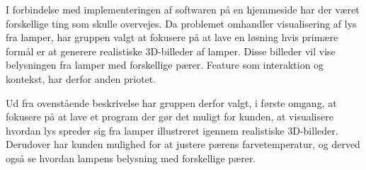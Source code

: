 I forbindelse med implementeringen af softwaren på en hjemmeside har der været forskellige ting som skulle overvejes. Da problemet omhandler visualisering af lys fra lamper, har gruppen valgt at fokusere på at lave en løsning hvis primære formål er at generere realistiske 3D-billeder af lamper. Disse billeder vil vise belysningen fra lamper med forskellige pærer. Feature som interaktion og kontekst, har derfor anden priotet. 

Ud fra ovenstående beskrivelse har gruppen derfor valgt, i første omgang, at fokusere på at lave et program der gør det muligt for kunden, at visualisere hvordan lys spreder sig fra lamper illustreret igennem realistiske 3D-billeder. Derudover har kunden mulighed for at justere pærens farvetemperatur, og derved også se hvordan lampens belysning med forskellige pærer.  


